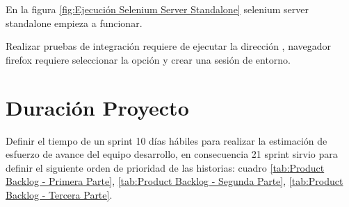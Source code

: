 \begin{enumerate}
En la figura \ref{fig:Ejecución Selenium Server Standalone} selenium server
standalone empieza a funcionar.

\begin{minipage}{1.0\textwidth}
	\centering
	\label{fig:Ejecución Selenium Server Standalone}
\end{minipage}

Realizar pruebas de integración requiere de ejecutar la dirección 
, navegador firefox requiere 
seleccionar la opción y crear una sesión de entorno.

\end{enumerate}

\section{Duración Proyecto}

Definir el tiempo de un sprint 10 días hábiles para realizar la estimación
de esfuerzo de avance del equipo desarrollo, en consecuencia 21 sprint
sirvio para definir el siguiente orden de prioridad de las historias: cuadro
\ref{tab:Product Backlog - Primera Parte}, 
\ref{tab:Product Backlog - Segunda Parte},
\ref{tab:Product Backlog - Tercera Parte}.



